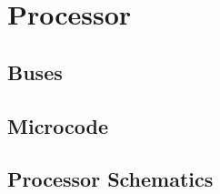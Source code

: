 




\setcounter{chapter}{0}

\renewcommand{\thepart}{\Alph{part}}
\renewcommand{\thechapter}{\Alph{part}\arabic{chapter}}
\renewcommand{\thepage}{\Alph{part}\arabic{chapter}-\arabic{page}}
\renewcommand{\thefigure}{\Alph{part}\arabic{chapter}.\arabic{figure}}
\renewcommand{\thetable}{\Alph{part}\arabic{chapter}.\arabic{schematic}}
\renewcommand{\thepage}{\thepart\thechapter-\arabic{page}}

\ifdefined\renderpartprocessor
  \part{Processor}
  \glsresetall

  
  
  \chapter{Buses}
  \glsresetall
  
  
  \chapter{Microcode}
  \glsresetall
  \label{chap:microcode}
  
  
  \chapter{Processor Schematics}
  \glsresetall
  \label{chap:processor-schematics}
  
\fi

